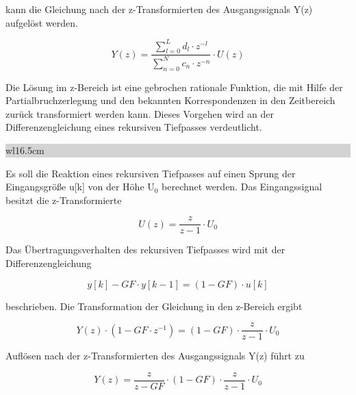 \noindent kann die Gleichung nach der z-Transformierten des Ausgangssignals Y(z) aufgel\"{o}st werden.

\begin{equation}\label{eq:sixfour}
Y\left(z\right)=\frac{\sum _{l=0}^{L}d_{l} \cdot z^{-l}  }{\sum _{n=0}^{N}c_{n} \cdot z^{-n}  } \cdot U\left(z\right)
\end{equation}

\noindent Die L\"{o}sung im z-Bereich ist eine gebrochen rationale Funktion, die mit Hilfe der Partialbruchzerlegung und den bekannten Korrespondenzen in den Zeitbereich zur\"{u}ck transformiert werden kann. Dieses Vorgehen wird an der Differenzengleichung eines rekursiven Tiefpasses verdeutlicht.\bigskip

\noindent
\colorbox{lightgray}{%
%
\renewcommand\arraystretch{0.6}%
\begin{tabular}{ wl{16.5cm} }
{\selectfont{Beispiel: Rekursiver Tiefpass ohne Anfangsbedingungen}}
\end{tabular}%
}\medskip

\noindent Es soll die Reaktion eines rekursiven Tiefpasses auf einen Sprung der Eingangsgr\"{o}{\ss}e u[k] von der H\"{o}he U${}_{0}$ berechnet werden. Das Eingangssignal besitzt die z-Transformierte

\begin{equation}\label{eq:sixfive}
U\left(z\right)=\frac{z}{z-1} \cdot U_{0}
\end{equation}

\noindent Das \"{U}bertragungsverhalten des rekursiven Tiefpasses wird mit der Differenzengleichung

\begin{equation}\label{eq:sixsix}
y\left[k\right]-GF\cdot y\left[k-1\right]=\left(1-GF\right)\cdot u\left[k\right]
\end{equation}

\noindent beschrieben. Die Transformation der Gleichung in den z-Bereich ergibt

\begin{equation}\label{eq:sixseven}
Y\left(z\right)\cdot \left(1-GF\cdot z^{-1} \right)=\left(1-GF\right)\cdot \frac{z}{z-1} \cdot U_{0}
\end{equation}

\noindent Aufl\"{o}sen nach der z-Transformierten des Ausgangssignals Y(z) f\"{u}hrt zu

\begin{equation}\label{eq:sixeight}
Y\left(z\right)=\frac{z}{z-GF} \cdot \left(1-GF\right)\cdot \frac{z}{z-1} \cdot U_{0}
\end{equation}


